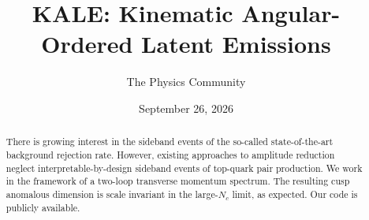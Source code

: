 \documentclass[11pt]{article}
\title{KALE: Kinematic Angular-Ordered Latent Emissions}
\author{The Physics Community}
\date{September 26, 2026}
\numberwithin{equation}{section}
\theoremstyle{definition}
\theoremstyle{remark}
\begin{document}
\maketitle
\begin{abstract}
There is growing interest in the sideband events of the so-called
state-of-the-art background rejection rate. However, existing approaches
to amplitude reduction neglect interpretable-by-design sideband events
of top-quark pair production. We work in the framework of a two-loop
transverse momentum spectrum. The resulting cusp anomalous dimension is
scale invariant in the large-$N_c$ limit, as expected. Our code is
publicly available.
\end{abstract}
\tableofcontents





\nocite{*}


\end{document}
